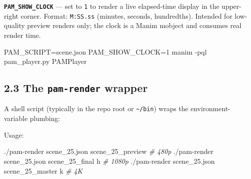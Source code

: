 \documentclass[
  11pt,
]{book}
\newenvironment{Shaded}{}{}
\newcommand{\AttributeTok}[1]{\textcolor[rgb]{0.49,0.56,0.16}{#1}}
\newcommand{\CommentTok}[1]{\textcolor[rgb]{0.38,0.63,0.69}{\textit{#1}}}
\newcommand{\DataTypeTok}[1]{\textcolor[rgb]{0.56,0.13,0.00}{#1}}
\newcommand{\ExtensionTok}[1]{#1}
\newcommand{\NormalTok}[1]{#1}
\newcommand{\OperatorTok}[1]{\textcolor[rgb]{0.40,0.40,0.40}{#1}}
\newcommand{\StringTok}[1]{\textcolor[rgb]{0.25,0.44,0.63}{#1}}
\newcommand{\VariableTok}[1]{\textcolor[rgb]{0.10,0.09,0.49}{#1}}
\begin{document}
\textbf{\texttt{PAM\_SHOW\_CLOCK}} --- set to \texttt{1} to render a
live elapsed-time display in the upper-right corner. Format:
\texttt{M:SS.ss} (minutes, seconds, hundredths). Intended for
low-quality preview renders only; the clock is a Manim mobject and
consumes real render time.

\begin{Shaded}
\begin{Highlighting}[]
\VariableTok{PAM\_SCRIPT}\OperatorTok{=}\NormalTok{scene.json }\VariableTok{PAM\_SHOW\_CLOCK}\OperatorTok{=}\NormalTok{1 }\ExtensionTok{manim} \AttributeTok{{-}pql}\NormalTok{ pam\_player.py PAMPlayer}
\end{Highlighting}
\end{Shaded}

\subsection{\texorpdfstring{2.3 The \texttt{pam-render}
wrapper}{2.3 The pam-render wrapper}}\label{the-pam-render-wrapper}

A shell script (typically in the repo root or
\texttt{\textasciitilde{}/bin}) wraps the environment-variable plumbing:

\begin{Shaded}
\end{Shaded}

Usage:

\begin{Shaded}
\begin{Highlighting}[]
\ExtensionTok{./pam{-}render}\NormalTok{ scene\_25.json scene\_25\_preview        }\CommentTok{\# 480p}
\ExtensionTok{./pam{-}render}\NormalTok{ scene\_25.json scene\_25\_final     h    }\CommentTok{\# 1080p}
\ExtensionTok{./pam{-}render}\NormalTok{ scene\_25.json scene\_25\_master    k    }\CommentTok{\# 4K}
\end{Highlighting}
\end{Shaded}
\end{document}
